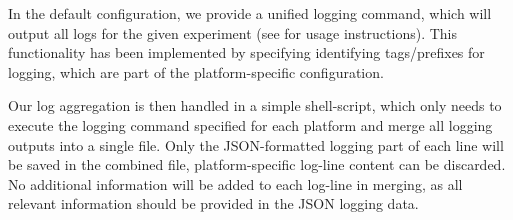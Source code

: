 \documentclass[../main.tex]{subfiles}
\begin{document}
In the default configuration, we provide a unified logging command, which will output all logs for the given experiment 
(see  for usage instructions). 
This functionality has been implemented by specifying identifying tags/prefixes for logging, 
which are part of the platform-specific configuration.

Our log aggregation is then handled in a simple shell-script, which only needs to execute the logging command specified 
for each platform and merge all logging outputs into a single file. 
Only the JSON-formatted logging part of each line will be saved in the combined file, platform-specific log-line content can be discarded. 
No additional information will be added to each log-line in merging, as all relevant information should be provided in the JSON logging data.
\end{document}
